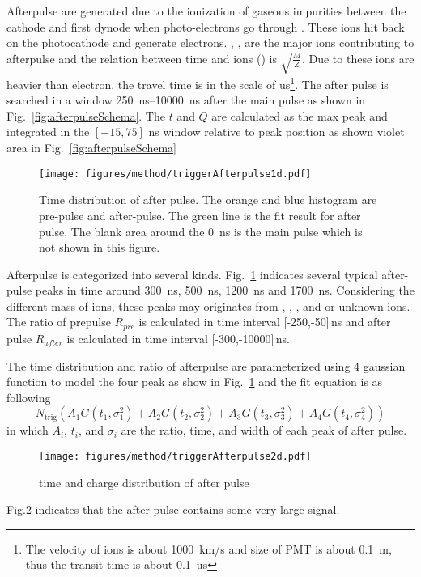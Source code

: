 Afterpulse are generated due to the ionization of gaseous impurities between the cathode and first dynode when photo-electrons go through \cite{Coates_1973}. These ions hit back on the photocathode and generate electrons. , ,  are the major ions contributing to afterpulse and the relation between time and ions () is $\sqrt{\frac{M}{Z}}$\cite{Coates_1973}. Due to these ions are heavier than electron, the travel time is in the scale of \si{us}\footnote{The velocity of ions is about \SI{1000}{km/s} and size of PMT is about \SI{0.1}{m}, thus the transit time is about \SI{0.1}{us}}. The after pulse is searched in a window \SIrange{250}{10000}{ns} after the main pulse as shown in Fig.~\ref{fig:afterpulseSchema}. The $t$ and $Q$ are calculated as the max peak and integrated in the $[-15,75]$ ns window relative to peak position as shown violet area in Fig.~\ref{fig:afterpulseSchema}
\begin{figure}[!htbp]
    \centering
    \texttt{[image: figures/method/triggerAfterpulse1d.pdf]}
    \caption{Time distribution of after pulse. The orange and blue histogram are pre-pulse and after-pulse. The green line is the fit result for after pulse. The blank area around the \SI{0}{ns} is the main pulse which is not shown in this figure.}
    \label{fig:afterpulse1d}
\end{figure}

Afterpulse is categorized into several kinds. Fig.~\ref{fig:afterpulse1d} indicates several typical after-pulse peaks in time around \SI{300}{ns}, \SI{500}{ns}, \SI{1200}{ns} and \SI{1700}{ns}. Considering the different mass of ions, these peaks may originates from , , , and  or unknown ions.
The ratio of prepulse $R_{pre}$ is calculated in time interval [-250,-50]\,ns and after pulse $R_{after}$ is calculated in time interval [-300,-10000]\,ns. 

The time distribution and ratio of afterpulse are parameterized using 4 gaussian function to model the four peak as show in Fig.~\ref{fig:afterpulse1d} and the fit equation is as following
\begin{equation}
    N_{\mathrm{trig}}(A_1G(t_1,\sigma_1^2)+A_2G(t_2,\sigma_2^2)+A_3G(t_3,\sigma_3^2)+A_4G(t_4,\sigma_4^2))
\end{equation}
in which $A_i$, $t_i$, and $\sigma_i$ are the ratio, time, and width of each peak of after pulse.
\begin{figure}[!htbp]
    \centering
    \texttt{[image: figures/method/triggerAfterpulse2d.pdf]}
    \caption{time and charge distribution of after pulse}
    \label{fig:afterpulse2d}
\end{figure}
Fig.\ref{fig:afterpulse2d} indicates that the after pulse contains some very large signal.

